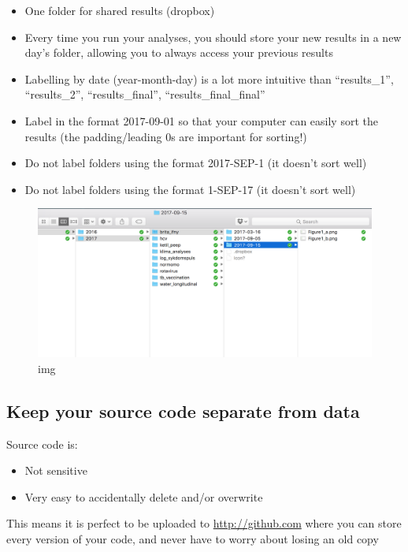 \documentclass[12pt,]{article}
\providecommand{\tightlist}{%
  \setlength{\itemsep}{0pt}\setlength{\parskip}{0pt}}
\begin{document}
\begin{itemize}
\tightlist
\item
  One folder for shared results (dropbox)
\item
  Every time you run your analyses, you should store your new results in
  a new day's folder, allowing you to always access your previous
  results
\item
  Labelling by date (year-month-day) is a lot more intuitive than
  ``results\_1'', ``results\_2'', ``results\_final'',
  ``results\_final\_final''
\item
  Label in the format 2017-09-01 so that your computer can easily sort
  the results (the padding/leading 0s are important for sorting!)
\item
  Do not label folders using the format 2017-SEP-1 (it doesn't sort
  well)
\item
  Do not label folders using the format 1-SEP-17 (it doesn't sort well)
\end{itemize}

\begin{figure}
\centering
\includegraphics{resources/folder_shared.png}
\caption{img}
\end{figure}

\subsection{Keep your source code separate from
data}\label{keep-your-source-code-separate-from-data}

Source code is:

\begin{itemize}
\tightlist
\item
  Not sensitive
\item
  Very easy to accidentally delete and/or overwrite
\end{itemize}

This means it is perfect to be uploaded to \url{http://github.com} where
you can store every version of your code, and never have to worry about
losing an old copy
\end{document}
